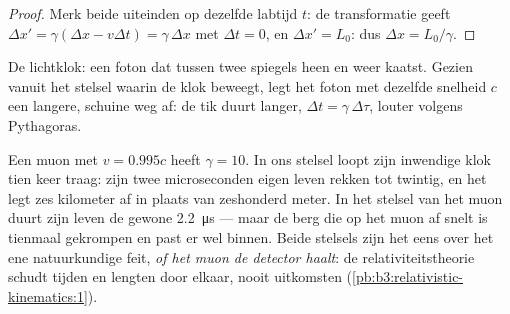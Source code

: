 \begin{proof}
Merk beide uiteinden op dezelfde labtijd $t$: de transformatie geeft
$\Delta x' = \gamma(\Delta x - v\Delta t) = \gamma\,\Delta x$ met
$\Delta t = 0$, en $\Delta x' = L_0$: dus $\Delta x = L_0/\gamma$.
\end{proof}

\begin{omfigure}

{\small De lichtklok: een foton dat tussen twee spiegels heen en weer
kaatst. Gezien vanuit het stelsel waarin de klok beweegt, legt het foton
met dezelfde snelheid $c$ een langere, schuine weg af: de tik duurt
langer, $\Delta t = \gamma\,\Delta\tau$, louter volgens Pythagoras.}
\end{omfigure}

\begin{example}\label{ex:b3:relativistic-kinematics:muon}
Een muon met $v = 0.995c$ heeft $\gamma = 10$. In ons stelsel loopt zijn
inwendige klok tien keer traag: zijn twee microseconden eigen leven rekken
tot twintig, en het legt zes kilometer af in plaats van zeshonderd meter.
In het stelsel van het muon duurt zijn leven de gewone
\qty{2.2}{\micro s} --- maar de berg die op het muon af snelt is tienmaal
gekrompen en past er wel binnen. Beide stelsels zijn het eens over het ene
natuurkundige feit, \emph{of het muon de detector haalt}: de
relativiteitstheorie schudt tijden en lengten door elkaar, nooit
uitkomsten (\cref{pb:b3:relativistic-kinematics:1}).
\end{example}

